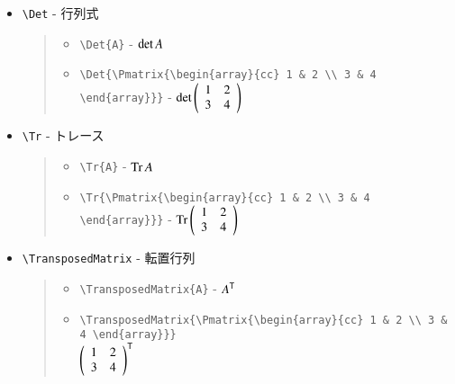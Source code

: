 \documentclass[oneside,10pt,a4paper]{jsarticle}
\begin{document}
\begin{itemize}
\begin{quote}
\begin{itemize}
        \end{itemize}
      \end{quote}
    \item \verb|\Det| - 行列式
      \begin{quote}
        \Example
        \begin{itemize}
          \item \verb|\Det{A}| - $\det A$
          \item \verb|\Det{\Pmatrix{\begin{array}{cc} 1 & 2 \\ 3 & 4 \end{array}}}| - $\det \left( \begin{array}{cc} 1 & 2 \\ 3 & 4 \end{array} \right)$
        \end{itemize}
      \end{quote}
    \item \verb|\Tr| - トレース \label{Tr}
      \begin{quote}
        \Example
        \begin{itemize}
          \item \verb|\Tr{A}| - $\operatorname{Tr} A$
          \item \verb|\Tr{\Pmatrix{\begin{array}{cc} 1 & 2 \\ 3 & 4 \end{array}}}| - $\operatorname{Tr} \left( \begin{array}{cc} 1 & 2 \\ 3 & 4 \end{array} \right)$
        \end{itemize}
      \end{quote}
    \item \verb|\TransposedMatrix| - 転置行列
      \begin{quote}
        \Example
        \begin{itemize}
          \item \verb|\TransposedMatrix{A}| - ${A}^{\mathsf{T}}$
          \item \verb|\TransposedMatrix{\Pmatrix{\begin{array}{cc} 1 & 2 \\ 3 & 4 \end{array}}}| \\ ${\left( \begin{array}{cc} 1 & 2 \\ 3 & 4 \end{array} \right)}^{\mathsf{T}}$

\end{itemize}
\end{quote}
\end{itemize}
\end{document}
